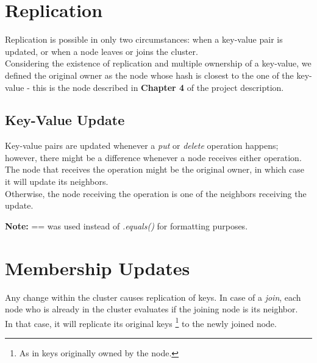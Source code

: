 \documentclass{article}
\begin{document}
\begin{multicols}{2}
    \section{Replication}
    Replication is possible in only two circumstances: when a key-value pair is updated, or when a node leaves or joins the cluster.\\
    
    Considering the existence of replication and multiple ownership of a key-value, we defined the original owner as the node whose hash is closest to the one of the key-value - this is the node described in \textbf{Chapter 4} of the project description.

    \subsection{Key-Value Update}
    Key-value pairs are updated whenever a \textit{put} or \textit{delete} operation happens; however, there might be a difference whenever a node receives either operation. \\
    
    The node that receives the operation might be the original owner, in which case it will update its neighbors. \\ 
    
    Otherwise, the node receiving the operation is one of the neighbors receiving the update.
    
    \textbf{Note:}{ == was used instead of \textit{.equals()} for formatting purposes.} 
    
    \section{Membership Updates}
    Any change within the cluster causes replication of keys. In case of a \textit{join}, each node who is already in the cluster evaluates if the joining node is its neighbor. \\
    
    In that case, it will replicate its original keys \footnote{As in keys originally owned by the node.} to the newly joined node.  \\
    

\end{multicols}
\end{document}
